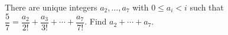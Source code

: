There are unique integers $a_2,\dots,a_7$ with $0\le a_i<i$ such that $\dfrac57=\dfrac{a_2}{2!}+\dfrac{a_3}{3!}+\cdots+\dfrac{a_7}{7!}$. Find $a_2+\cdots+a_7$.
